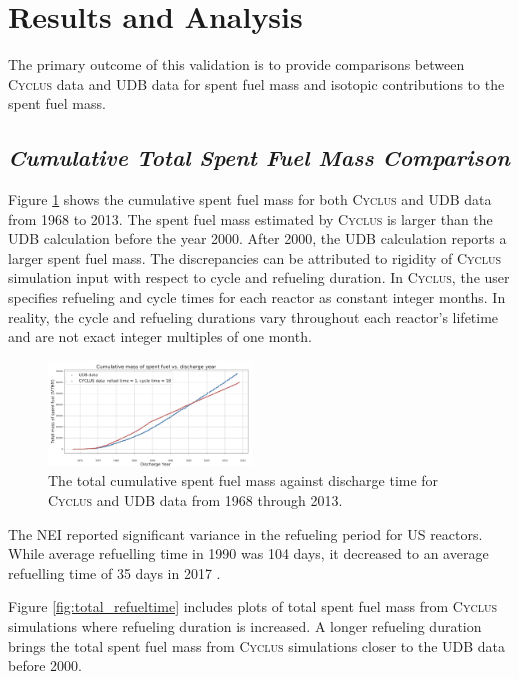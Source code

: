 \documentclass{anstrans}
\newcommand{\Cyclus}{\textsc{Cyclus}\xspace}%
\begin{document}
\section{Results and Analysis}
The primary outcome of this validation is to provide comparisons between 
\Cyclus data and \gls{UDB} data for spent fuel mass and isotopic contributions to the 
spent fuel mass. 

\subsection{\textit{Cumulative Total Spent Fuel Mass Comparison}}
Figure \ref{fig:total_original} shows the cumulative spent fuel mass for both 
\Cyclus and \gls{UDB} data from 1968 to 2013. The spent fuel mass estimated by 
\Cyclus is larger than the \gls{UDB} calculation before the year 2000. After 2000,
the \gls{UDB} calculation reports a larger spent fuel mass. The discrepancies can be 
attributed to rigidity of \Cyclus simulation input with respect to cycle and 
refueling duration. In \Cyclus, the user specifies refueling and cycle times for each 
reactor as constant integer months.  In reality, the cycle and refueling durations 
vary throughout each reactor's lifetime and are not exact integer multiples of 
one month. 

\begin{figure}[t] %
	\centering
	\includegraphics[width=0.48\textwidth]{figures/total_cumulative_mass_spent_fuel_original}
	\caption{The total cumulative spent fuel mass against discharge time for \Cyclus and \gls{UDB} data from 1968 through 2013.}
	\label{fig:total_original}
\end{figure}

The \gls{NEI} reported significant 
variance in the refueling period for \gls{US} reactors. While average 
refuelling time in 1990 was 104 days, it decreased to an average 
refuelling time of 35 days in 2017 \cite{iaea_current_nodate}.

Figure \ref{fig:total_refueltime} includes plots of total spent fuel mass from 
\Cyclus simulations where refueling duration is increased. A longer refueling duration brings 
the total spent fuel mass from \Cyclus simulations closer to the \gls{UDB} data 
before 2000. 
\end{document}
